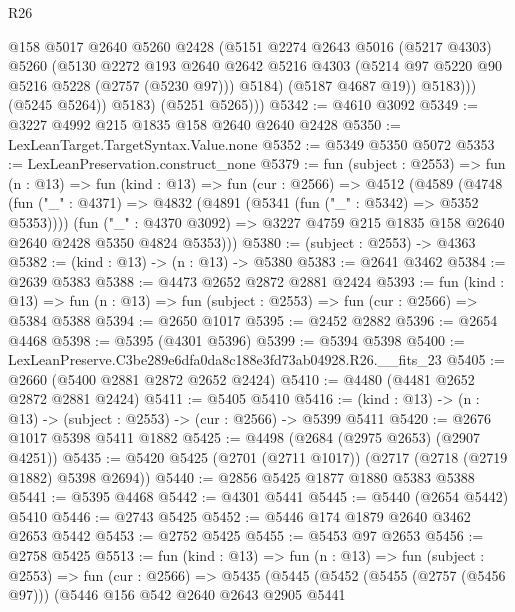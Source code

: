 \begin{lexlean}{R26}
\begin{coremodule}
                  @158
                  @5017
                  @2640
                  @5260
                  @2428
                  (@5151
                    @2274
                    @2643
                    @5016
                    (@5217 @4303)
                    @5260
                    (@5130
                      @2272
                      @193
                      @2640
                      @2642
                      @5216
                      @4303
                      (@5214 @97 @5220 @90 @5216 @5228 (@2757 (@5230 @97)))
                      @5184)
                    (@5187 @4687 @19))
                  @5183)))
            (@5245 @5264))
          @5183)
        (@5251 @5265)))
@5342 := @4610 @3092
@5349 := @3227 @4992 @215 @1835 @158 @2640 @2640 @2428
@5350 := LexLeanTarget.TargetSyntax.Value.none
@5352 := @5349 @5350 @5072
@5353 := LexLeanPreservation.construct_none
@5379 := fun (subject : @2553) =>
  fun (n : @13) =>
  fun (kind : @13) =>
  fun (cur : @2566) =>
  @4512
    (@4589
      (@4748
        (fun ("_" : @4371) => @4832 (@4891 (@5341 (fun ("_" : @5342) => @5352 @5353))))
        (fun ("_" : @4370 @3092) =>
        @3227 @4759 @215 @1835 @158 @2640 @2640 @2428 @5350 @4824 @5353)))
@5380 := (subject : @2553) -> @4363
@5382 := (kind : @13) -> (n : @13) -> @5380
@5383 := @2641 @3462
@5384 := @2639 @5383
@5388 := @4473 @2652 @2872 @2881 @2424
@5393 := fun (kind : @13) =>
  fun (n : @13) => fun (subject : @2553) => fun (cur : @2566) => @5384 @5388
@5394 := @2650 @1017
@5395 := @2452 @2882
@5396 := @2654 @4468
@5398 := @5395 (@4301 @5396)
@5399 := @5394 @5398
@5400 := LexLeanPreserve.C3be289e6dfa0da8c188e3fd73ab04928.R26.__fits_23
@5405 := @2660 (@5400 @2881 @2872 @2652 @2424)
@5410 := @4480 (@4481 @2652 @2872 @2881 @2424)
@5411 := @5405 @5410
@5416 := (kind : @13) -> (n : @13) -> (subject : @2553) -> (cur : @2566) -> @5399 @5411
@5420 := @2676 @1017 @5398 @5411 @1882
@5425 := @4498 (@2684 (@2975 @2653) (@2907 @4251))
@5435 := @5420 @5425 (@2701 (@2711 @1017)) (@2717 (@2718 (@2719 @1882) @5398 @2694))
@5440 := @2856 @5425 @1877 @1880 @5383 @5388
@5441 := @5395 @4468
@5442 := @4301 @5441
@5445 := @5440 (@2654 @5442) @5410
@5446 := @2743 @5425
@5452 := @5446 @174 @1879 @2640 @3462 @2653 @5442
@5453 := @2752 @5425
@5455 := @5453 @97 @2653
@5456 := @2758 @5425
@5513 := fun (kind : @13) =>
  fun (n : @13) =>
  fun (subject : @2553) =>
  fun (cur : @2566) =>
  @5435
    (@5445
      (@5452
        (@5455 (@2757 (@5456 @97)))
        (@5446
          @156
          @542
          @2640
          @2643
          @2905
          @5441

\end{coremodule}
\end{lexlean}
